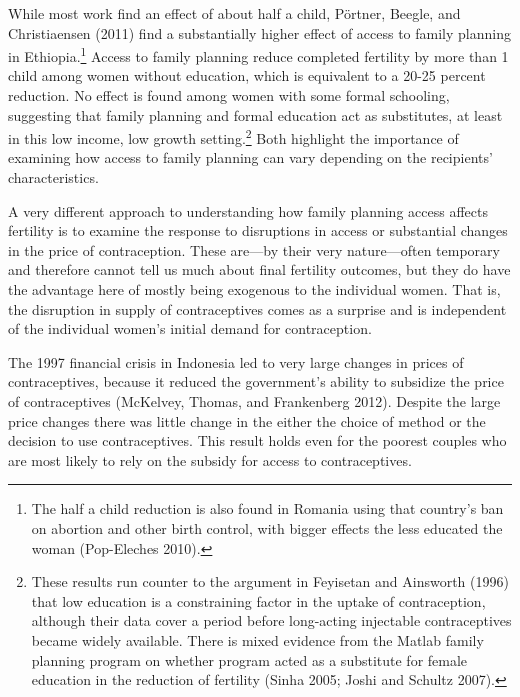 \documentclass[]{article}
\begin{document}
While most work find an effect of about half a child, Pörtner, Beegle, and Christiaensen (2011) find a substantially higher effect of access to family planning in Ethiopia.\footnote{The half a child reduction is also found in Romania using that country's ban on abortion and other birth control, with bigger effects the less educated the woman (Pop-Eleches 2010).} Access to family planning reduce completed fertility by more than 1 child among women without education, which is equivalent to a 20-25 percent reduction. No effect is found among women with some formal schooling, suggesting that family planning and formal education act as substitutes, at least in this low income, low growth setting.\footnote{These results run counter to the argument in Feyisetan and Ainsworth (1996) that low education is a constraining factor in the uptake of contraception, although their data cover a period before long-acting injectable contraceptives became widely available. There is mixed evidence from the Matlab family planning program on whether program acted as a substitute for female education in the reduction of fertility (Sinha 2005; Joshi and Schultz 2007).} Both highlight the importance of examining how access to family planning can vary depending on the recipients' characteristics.

A very different approach to understanding how family planning access affects fertility is to examine the response to disruptions in access or substantial changes in the price of contraception. These are---by their very nature---often temporary and therefore cannot tell us much about final fertility outcomes, but they do have the advantage here of mostly being exogenous to the individual women. That is, the disruption in supply of contraceptives comes as a surprise and is independent of the individual women's initial demand for contraception.

The 1997 financial crisis in Indonesia led to very large changes in prices of contraceptives, because it reduced the government's ability to subsidize the price of contraceptives (McKelvey, Thomas, and Frankenberg 2012). Despite the large price changes there was little change in the either the choice of method or the decision to use contraceptives. This result holds even for the poorest couples who are most likely to rely on the subsidy for access to contraceptives.
\end{document}
